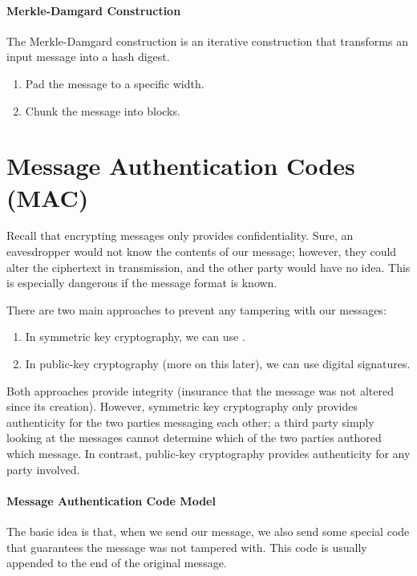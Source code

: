 

\paragraph{Merkle-Damgard Construction}

The Merkle-Damgard construction is an iterative construction that transforms an input message into a hash digest.

\begin{enumerate}
    \item Pad the message to a specific width.
    \item Chunk the message into blocks.
\end{enumerate}


\section{Message Authentication Codes (MAC)}
Recall that encrypting messages only provides confidentiality. Sure, an eavesdropper would not know the contents of our message; however, they could alter the ciphertext in transmission, and the other party would have no idea. This is especially dangerous if the message format is known.

There are two main approaches to prevent any tampering with our messages:
\begin{enumerate}
    \item In symmetric key cryptography, we can use .
    \item In public-key cryptography (more on this later), we can use digital signatures.
\end{enumerate}

Both approaches provide integrity (insurance that the message was not altered since its creation). However, symmetric key cryptography only provides authenticity for the two parties messaging each other; a third party simply looking at the messages cannot determine which of the two parties authored which message. In contrast, public-key cryptography provides authenticity for any party involved.

\paragraph{Message Authentication Code Model}
The basic idea is that, when we send our message, we also send some special code that guarantees the message was not tampered with. This code is usually appended to the end of the original message.

